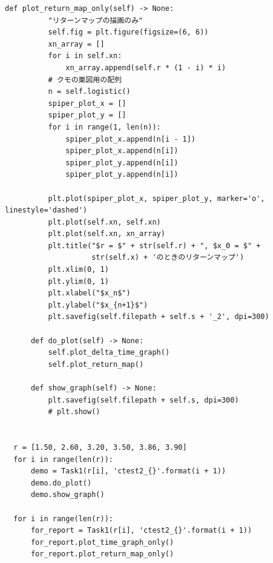 \begin{lstlisting}[caption=week1.py]
      def plot_return_map_only(self) -> None:
          "リターンマップの描画のみ"
          self.fig = plt.figure(figsize=(6, 6))
          xn_array = []
          for i in self.xn:
              xn_array.append(self.r * (1 - i) * i)
          # クモの巣図用の配列
          n = self.logistic()
          spiper_plot_x = []
          spiper_plot_y = []
          for i in range(1, len(n)):
              spiper_plot_x.append(n[i - 1])
              spiper_plot_x.append(n[i])
              spiper_plot_y.append(n[i])
              spiper_plot_y.append(n[i])
  
          plt.plot(spiper_plot_x, spiper_plot_y, marker='o', linestyle='dashed')
          plt.plot(self.xn, self.xn)
          plt.plot(self.xn, xn_array)
          plt.title("$r = $" + str(self.r) + ", $x_0 = $" +
                    str(self.x) + 'のときのリターンマップ')
          plt.xlim(0, 1)
          plt.ylim(0, 1)
          plt.xlabel("$x_n$")
          plt.ylabel("$x_{n+1}$")
          plt.savefig(self.filepath + self.s + '_2', dpi=300)
  
      def do_plot(self) -> None:
          self.plot_delta_time_graph()
          self.plot_return_map()
  
      def show_graph(self) -> None:
          plt.savefig(self.filepath + self.s, dpi=300)
          # plt.show()
  
  
  r = [1.50, 2.60, 3.20, 3.50, 3.86, 3.90]
  for i in range(len(r)):
      demo = Task1(r[i], 'ctest2_{}'.format(i + 1))
      demo.do_plot()
      demo.show_graph()
  
  for i in range(len(r)):
      for_report = Task1(r[i], 'ctest2_{}'.format(i + 1))
      for_report.plot_time_graph_only()
      for_report.plot_return_map_only()
  
\end{lstlisting}